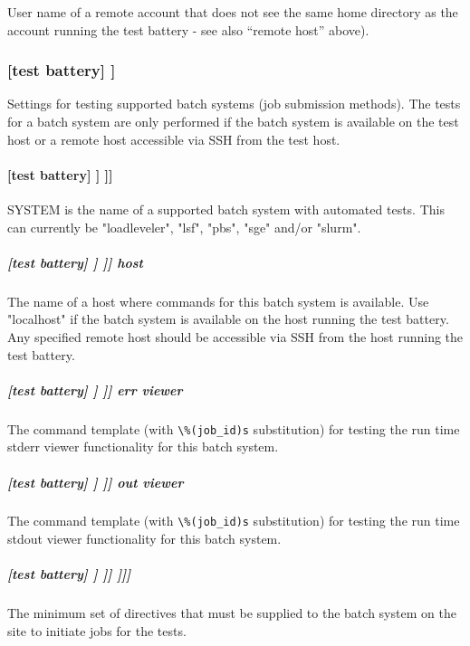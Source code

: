User name of a remote account that does not see the same home directory as the
account running the test battery - see also ``remote host'' above).

\subsubsection[{[[}batch systems{]]}]{[test battery] \textrightarrow [[batch systems]]}

Settings for testing supported batch systems (job submission methods). The
tests for a batch system are only performed if the batch system is available on
the test host or a remote host accessible via SSH from the test host.

\paragraph[{[[[}SYSTEM{]]]}]{[test battery] \textrightarrow [[batch systems]] \textrightarrow [[[SYSTEM]]]}

SYSTEM is the name of a supported batch system with automated tests.
This can currently be "loadleveler", "lsf", "pbs", "sge" and/or "slurm".

\subparagraph[host]{[test battery] \textrightarrow [[batch systems]] \textrightarrow [[[SYSTEM]]] \textrightarrow host}

The name of a host where commands for this batch system is available. Use
"localhost" if the batch system is available on the host running the test
battery. Any specified remote host should be accessible via SSH from the host
running the test battery.

\subparagraph[err viewer]{[test battery] \textrightarrow [[batch systems]] \textrightarrow [[[SYSTEM]]] \textrightarrow err viewer}

The command template (with \lstinline=\%(job_id)s= substitution) for testing
the run time stderr viewer functionality for this batch system.

\subparagraph[out viewer]{[test battery] \textrightarrow [[batch systems]] \textrightarrow [[[SYSTEM]]] \textrightarrow out viewer}

The command template (with \lstinline=\%(job_id)s= substitution) for testing
the run time stdout viewer functionality for this batch system.

\subparagraph[{[[[[}directives{]]]]}]{[test battery] \textrightarrow [[batch systems]] \textrightarrow [[[SYSTEM]]] \textrightarrow [[[[directives]]]]}

The minimum set of directives that must be supplied to the batch system on the
site to initiate jobs for the tests.

